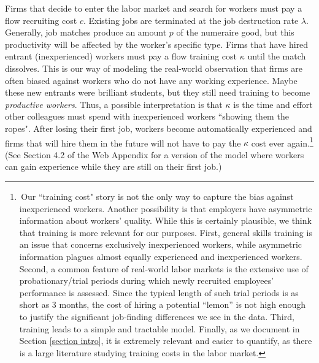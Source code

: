 \documentclass[12pt]{article} %
\theoremstyle{definition}
\begin{document}
Firms that decide to enter the labor market and search for workers must pay a flow recruiting cost $c$. Existing jobs are terminated at the job destruction rate $\lambda$. Generally, job matches produce an amount $p$ of the numeraire good, but this productivity will be affected by the worker's specific type. Firms that have hired entrant (inexperienced) workers must pay a flow training cost $\kappa$ until the match dissolves. This is our way of modeling the real-world observation that firms are often biased against workers who do not have any working experience. Maybe these new entrants were brilliant students, but they still need training to become \textit{productive workers}. Thus, a possible interpretation is that $\kappa$ is the time and effort other colleagues must spend with inexperienced workers ``showing them the ropes". 
After losing their first job, workers become automatically experienced and firms that will hire them in the future will not have to pay the $\kappa$ cost ever again.\footnote{\,Our ``training cost" story is not the only way to capture the bias against inexperienced workers. Another possibility is that employers have asymmetric information about workers' quality. 
While this is certainly plausible, we think that training is more relevant for our purposes. 
First, general skills training is an issue that concerns exclusively inexperienced workers, while asymmetric information plagues almost equally experienced and inexperienced workers.
Second, a common feature of real-world labor markets is the extensive use of probationary/trial periods during which newly recruited employees' performance is assessed.
Since the typical length of such trial periods is as short as 3 months, the cost of hiring a potential ``lemon'' is not high enough to justify the significant job-finding differences we see in the data.
Third, training leads to a simple and tractable model. 
Finally, as we document in Section \ref{section intro}, it is extremely relevant and easier to quantify, as there is a large literature studying training costs in the labor market.} (See Section 4.2 of the Web Appendix for a version of the model where workers can gain experience while they are still on their first job.) 
\end{document}
